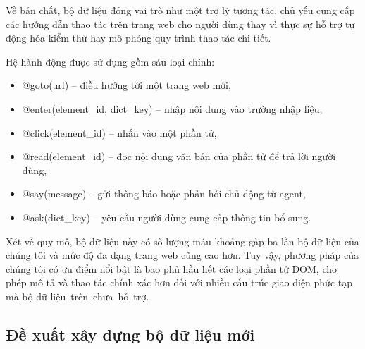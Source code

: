 \documentclass[a4paper, 12pt]{report}
\begin{document}
{Về bản chất, bộ dữ liệu đóng vai trò như một trợ lý tương tác, chủ yếu cung cấp các hướng dẫn thao tác trên trang web cho người dùng thay vì thực sự hỗ trợ tự động hóa kiểm thử hay mô phỏng quy trình thao tác chi tiết.


Hệ hành động được sử dụng gồm sáu loại chính:
\begin{itemize}
    \item @goto(url) – điều hướng tới một trang web mới,
    \item @enter(element\_id, dict\_key) – nhập nội dung vào trường nhập liệu,
    \item @click(element\_id) – nhấn vào một phần tử,
    \item @read(element\_id) – đọc nội dung văn bản của phần tử để trả lời người dùng,
    \item @say(message) – gửi thông báo hoặc phản hồi chủ động từ agent,
    \item @ask(dict\_key) – yêu cầu người dùng cung cấp thông tin bổ sung.
\end{itemize}

Xét về quy mô, bộ dữ liệu này có số lượng mẫu khoảng gấp ba lần bộ dữ liệu của chúng tôi và mức độ đa dạng trang web cũng cao hơn. Tuy vậy, phương pháp của chúng tôi có ưu điểm nổi bật là bao phủ hầu hết các loại phần tử DOM, cho phép mô tả và thao tác chính xác hơn đối với nhiều cấu trúc giao diện phức tạp mà bộ dữ liệu~trên~chưa~hỗ~trợ.

\subsection{Đề xuất xây dựng bộ dữ liệu mới}

}
\end{document}

